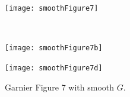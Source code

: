 \documentclass[11pt,a4paper, final, dvipsnames]{article}
\begin{document}
\begin{figure}
    \centering
    \begin{minipage}[b]{\textwidth}
        \centering
        
        \texttt{[image: smoothFigure7]}
    \end{minipage} \\
    
    \begin{minipage}[b]{0.49\textwidth}
        \centering
        \texttt{[image: smoothFigure7b]}
    \end{minipage} %
    \begin{minipage}[b]{0.49\textwidth}
        \centering                    
        \texttt{[image: smoothFigure7d]}
    \end{minipage}
    \caption{Garnier Figure 7 with smooth $G$.}
\end{figure}
\end{document}
